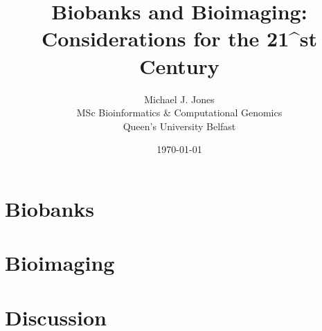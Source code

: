 \documentclass[a4paper, 12pt]{article}
\title{Biobanks and Bioimaging: Considerations for the 21^{st} Century}
\author{Michael J. Jones \\
  MSc Bioinformatics \& Computational Genomics \\
  Queen's University Belfast}
\date{\today}
\begin{document}
\section{Biobanks}

\section{Bioimaging}

\section{Discussion}

\printbibliography
\end{document}
